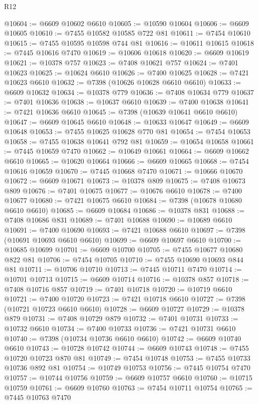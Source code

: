 \begin{lexlean}{R12}
\begin{coremodule}
@10604 := @6609 @10602 @6610
@10605 := @10590 @10604
@10606 := @6609 @10605
@10610 := @7455 @10582 @10585 @722 @81
@10611 := @7454 @10610
@10615 := @7455 @10595 @10598 @744 @81
@10616 := @10611 @10615
@10618 := @7445 @10616 @7470
@10619 := @10606 @10618
@10620 := @6609 @10619
@10621 := @10378 @757
@10623 := @7408 @10621 @757
@10624 := @7401 @10623
@10625 := @10624 @6610
@10626 := @7400 @10625
@10628 := @7421 @10623 @6610
@10632 := @7398 (@10626 @10628 @6610 @6610)
@10633 := @6609 @10632
@10634 := @10378 @779
@10636 := @7408 @10634 @779
@10637 := @7401 @10636
@10638 := @10637 @6610
@10639 := @7400 @10638
@10641 := @7421 @10636 @6610
@10645 := @7398 (@10639 @10641 @6610 @6610)
@10647 := @6609 @10645 @6610
@10648 := @10633 @10647
@10649 := @6609 @10648
@10653 := @7455 @10625 @10628 @770 @81
@10654 := @7454 @10653
@10658 := @7455 @10638 @10641 @792 @81
@10659 := @10654 @10658
@10661 := @7445 @10659 @7470
@10662 := @10649 @10661
@10664 := @6609 @10662 @6610
@10665 := @10620 @10664
@10666 := @6609 @10665
@10668 := @7454 @10616 @10659
@10670 := @7445 @10668 @7470
@10671 := @10666 @10670
@10672 := @6609 @10671
@10673 := @10378 @809
@10675 := @7408 @10673 @809
@10676 := @7401 @10675
@10677 := @10676 @6610
@10678 := @7400 @10677
@10680 := @7421 @10675 @6610
@10684 := @7398 (@10678 @10680 @6610 @6610)
@10685 := @6609 @10684
@10686 := @10378 @831
@10688 := @7408 @10686 @831
@10689 := @7401 @10688
@10690 := @10689 @6610
@10691 := @7400 @10690
@10693 := @7421 @10688 @6610
@10697 := @7398 (@10691 @10693 @6610 @6610)
@10699 := @6609 @10697 @6610
@10700 := @10685 @10699
@10701 := @6609 @10700
@10705 := @7455 @10677 @10680 @822 @81
@10706 := @7454 @10705
@10710 := @7455 @10690 @10693 @844 @81
@10711 := @10706 @10710
@10713 := @7445 @10711 @7470
@10714 := @10701 @10713
@10715 := @6609 @10714
@10716 := @10378 @857
@10718 := @7408 @10716 @857
@10719 := @7401 @10718
@10720 := @10719 @6610
@10721 := @7400 @10720
@10723 := @7421 @10718 @6610
@10727 := @7398 (@10721 @10723 @6610 @6610)
@10728 := @6609 @10727
@10729 := @10378 @879
@10731 := @7408 @10729 @879
@10732 := @7401 @10731
@10733 := @10732 @6610
@10734 := @7400 @10733
@10736 := @7421 @10731 @6610
@10740 := @7398 (@10734 @10736 @6610 @6610)
@10742 := @6609 @10740 @6610
@10743 := @10728 @10742
@10744 := @6609 @10743
@10748 := @7455 @10720 @10723 @870 @81
@10749 := @7454 @10748
@10753 := @7455 @10733 @10736 @892 @81
@10754 := @10749 @10753
@10756 := @7445 @10754 @7470
@10757 := @10744 @10756
@10759 := @6609 @10757 @6610
@10760 := @10715 @10759
@10761 := @6609 @10760
@10763 := @7454 @10711 @10754
@10765 := @7445 @10763 @7470

\end{coremodule}
\end{lexlean}
